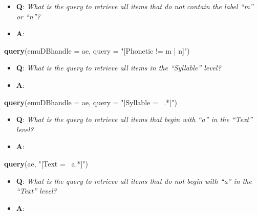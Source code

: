 \documentclass[]{book}
\newenvironment{Shaded}{\begin{snugshade}}{\end{snugshade}}
\newcommand{\DataTypeTok}[1]{\textcolor[rgb]{0.13,0.29,0.53}{#1}}
\newcommand{\KeywordTok}[1]{\textcolor[rgb]{0.13,0.29,0.53}{\textbf{#1}}}
\newcommand{\NormalTok}[1]{#1}
\newcommand{\StringTok}[1]{\textcolor[rgb]{0.31,0.60,0.02}{#1}}
\providecommand{\tightlist}{%
  \setlength{\itemsep}{0pt}\setlength{\parskip}{0pt}}
\theoremstyle{definition}
\theoremstyle{definition}
\theoremstyle{definition}
\theoremstyle{remark}
\begin{document}
\begin{itemize}
\tightlist
\item
  \textbf{Q}: \emph{What is the query to retrieve all items that do not
  contain the label ``m'' or ``n''?}
\item
  \textbf{A}:
\end{itemize}

\begin{Shaded}
\begin{Highlighting}[]
\KeywordTok{query}\NormalTok{(}\DataTypeTok{emuDBhandle =}\NormalTok{ ae, }
      \DataTypeTok{query =} \StringTok{"[Phonetic != m | n]"}\NormalTok{)}
\end{Highlighting}
\end{Shaded}

\begin{itemize}
\tightlist
\item
  \textbf{Q}: \emph{What is the query to retrieve all items in the
  ``Syllable'' level?}
\item
  \textbf{A}:
\end{itemize}

\begin{Shaded}
\begin{Highlighting}[]
\KeywordTok{query}\NormalTok{(}\DataTypeTok{emuDBhandle =}\NormalTok{ ae, }
      \DataTypeTok{query =} \StringTok{"[Syllable =~ .*]"}\NormalTok{)}
\end{Highlighting}
\end{Shaded}

\begin{itemize}
\tightlist
\item
  \textbf{Q}: \emph{What is the query to retrieve all items that begin
  with ``a'' in the ``Text'' level?}
\item
  \textbf{A}:
\end{itemize}

\begin{Shaded}
\begin{Highlighting}[]
\KeywordTok{query}\NormalTok{(ae, }\StringTok{"[Text =~ a.*]"}\NormalTok{)}
\end{Highlighting}
\end{Shaded}

\begin{itemize}
\tightlist
\item
  \textbf{Q}: \emph{What is the query to retrieve all items that do not
  begin with ``a'' in the ``Text'' level?}
\item
  \textbf{A}:
\end{itemize}
\end{document}
